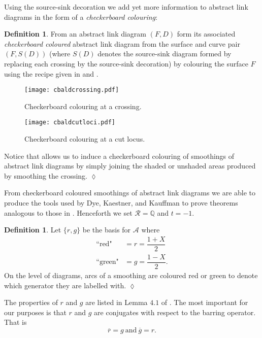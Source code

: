 \documentclass[10pt,oneside]{amsart}
\theoremstyle{definition}
\newtheorem{definition}[theorem]{Definition}
\numberwithin{equation}{section}
\DeclareRobustCommand{\CloseDef}{	\leavevmode\unskip\penalty9999 \hbox{}\nobreak\hfill
	\quad\hbox{$\lozenge$}}
\begin{document}
Using the source-sink decoration we add yet more information to abstract link diagrams in the form of a \textit{checkerboard colouring}:

\begin{definition}
\label{Def:checkerboard}
	From an abstract link diagram \( \left( F , D \right) \) form its associated \emph{checkerboard coloured} abstract link diagram from the surface and curve pair \( \left( F , S ( D ) \right) \) (where \( S ( D ) \) denotes the source-sink diagram formed by replacing each crossing by the source-sink decoration) by colouring the surface \( F \) using the recipe given in  and .
	\begin{figure}
		\texttt{[image: cbaldcrossing.pdf]}
		\caption{Checkerboard colouring at a crossing.}
		\label{Fig:checkerboard}
	\end{figure}
	\begin{figure}
		\texttt{[image: cbaldcutloci.pdf]}
		\caption{Checkerboard colouring at a cut locus.}
		\label{Fig:checkerboardcutloci}
	\end{figure}
	Notice that  allows us to induce a checkerboard colouring of smoothings of abstract link diagrams by simply joining the shaded or unshaded areas produced by smoothing the crossing.\CloseDef
\end{definition}

From checkerboard coloured smoothings of abstract link diagrams we are able to produce the tools used by Dye, Kaestner, and Kauffman to prove theorems analogous to those in \cite{Bar-Natan2006}. Henceforth we set \( \mathcal{R} = \mathbb{Q} \) and \( t = -1 \).

\begin{definition}
\label{Def:redgreen}
	 Let \( \lbrace r, g \rbrace \) be the basis for \( \mathcal{A} \) where
	 \begin{equation*}
	 \begin{aligned}
	 \text{``red"} &= r = \dfrac{1 + X}{2} \\
	 \text{``green"} &= g = \dfrac{1 - X}{2}.
	 \end{aligned}
	 \end{equation*}
	 On the level of diagrams, arcs of a smoothing are coloured red or green to denote which generator they are labelled with.\CloseDef
\end{definition}

The properties of \( r \) and \( g \) are listed in Lemma \( 4.1 \) of \cite{Dye2014}. The most important for our purposes is that \( r \) and \( g \) are conjugates with respect to the barring operator. That is
\begin{equation*}
\overline{r} = g ~ \text{and} ~ \overline{g} = r.
\end{equation*}
\end{document}
